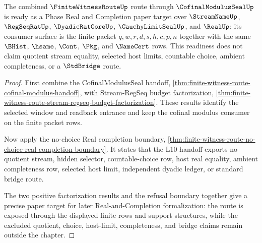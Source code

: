 \begin{theorem}
\label{thm:finite-witness-route-real-completion-readiness}
The combined $\FiniteWitnessRouteUp$ route through $\CofinalModulusSealUp$ is ready as a Phase Real and Completion paper target over $\StreamNameUp$, $\RegSeqRatUp$, $\DyadicRatCoreUp$, $\CauchyLimitSealUp$, and $\RealUp$: its consumer surface is the finite packet $q,w,r,d,s,h,c,p,n$ together with the same $\BHist$, $\hsame$, $\Cont$, $\Pkg$, and $\NameCert$ rows. This readiness does not claim quotient stream equality, selected host limits, countable choice, ambient completeness, or a $\StdBridge$ route.
\end{theorem}
\begin{proof}
First combine the CofinalModulusSeal handoff, \autoref{thm:finite-witness-route-cofinal-modulus-handoff}, with Stream-RegSeq budget factorization, \autoref{thm:finite-witness-route-stream-regseq-budget-factorization}. These results identify the selected window and readback entrance and keep the cofinal modulus consumer on the finite packet rows.

Now apply the no-choice Real completion boundary, \autoref{thm:finite-witness-route-no-choice-real-completion-boundary}. It states that the L10 handoff exports no quotient stream, hidden selector, countable-choice row, host real equality, ambient completeness row, selected host limit, independent dyadic ledger, or standard bridge route.

The two positive factorization results and the refusal boundary together give a precise paper target for later Real-and-Completion formalization: the route is exposed through the displayed finite rows and support structures, while the excluded quotient, choice, host-limit, completeness, and bridge claims remain outside the chapter.
\end{proof}


